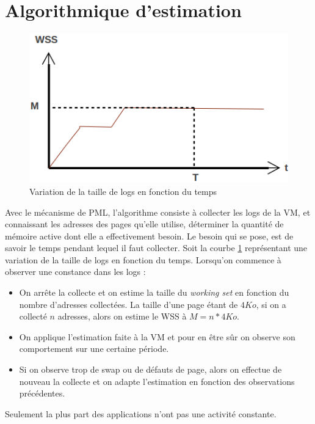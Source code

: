 \section{Algorithmique d'estimation}
\label{section:contrib_algo}
\begin{figure}[H]
    \centering
    \includegraphics[scale=.5]{chapters/3/fig3/courbe_wss_1}
    \caption{Variation de la taille de logs en fonction du temps}
    \label{fig:courbe_wss_cst}
\end{figure}
Avec le mécanisme de PML, l'algorithme consiste à collecter les logs de la VM, et connaissant les adresses des pages qu'elle utilise, déterminer la quantité de mémoire active dont elle a effectivement besoin. Le besoin qui se pose, est de savoir le temps pendant lequel il faut collecter. Soit la courbe \ref{fig:courbe_wss_cst} représentant une variation de la taille de logs en fonction du temps. Lorsqu'on commence à observer une constance dans les logs : 
\begin{itemize}
    \item On arrête la collecte et on estime la taille du \textit{working set} en fonction du nombre d'adresses collectées. La taille d'une page étant de $4Ko$, si on a collecté $n$ adresses, alors on estime le WSS à $M = n*4 Ko$.
    \item On applique l'estimation faite à la VM et pour en être sûr on observe son comportement sur une certaine période.
    \item Si on observe trop de swap ou de défauts de page, alors on effectue de nouveau la collecte et on adapte l'estimation en fonction des observations précédentes.
\end{itemize}

\noindent Seulement la plus part des applications n'ont pas une activité constante.

